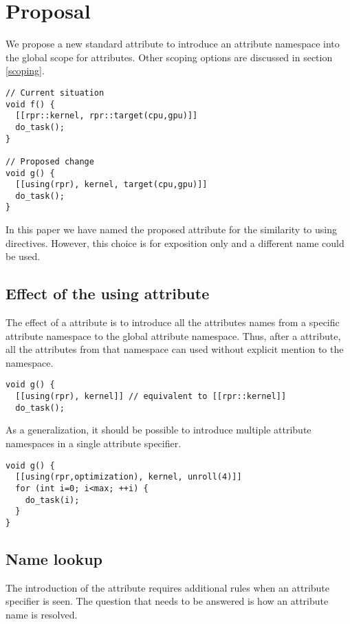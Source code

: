 \section{Proposal}

We propose a new standard attribute to introduce an attribute namespace
into the global scope for attributes. Other scoping options are discussed in section \ref{scoping}.

\begin{lstlisting}
// Current situation
void f() {
  [[rpr::kernel, rpr::target(cpu,gpu)]]
  do_task();
}

// Proposed change
void g() {
  [[using(rpr), kernel, target(cpu,gpu)]]
  do_task();
}
\end{lstlisting}

In this paper we have named the proposed attribute  for the similarity to using directives. However,
this choice is for exposition only and a different name could be used.

\subsection{Effect of the using attribute}

The effect of a  attribute is to introduce all the attributes
names from a specific attribute namespace to the global attribute namespace.
Thus, after a  attribute, all the attributes from that namespace
can used without explicit mention to the namespace.

\begin{lstlisting}
void g() {
  [[using(rpr), kernel]] // equivalent to [[rpr::kernel]]
  do_task();
\end{lstlisting}

As a generalization, it should be possible to introduce multiple attribute
namespaces in a single attribute specifier.

\begin{lstlisting}
void g() {
  [[using(rpr,optimization), kernel, unroll(4)]]
  for (int i=0; i<max; ++i) {
    do_task(i);
  }
}
\end{lstlisting}

\subsection{Name lookup}

The introduction of the  attribute requires additional
rules when an attribute specifier is seen. The question that needs to
be answered is how an attribute name is resolved.

